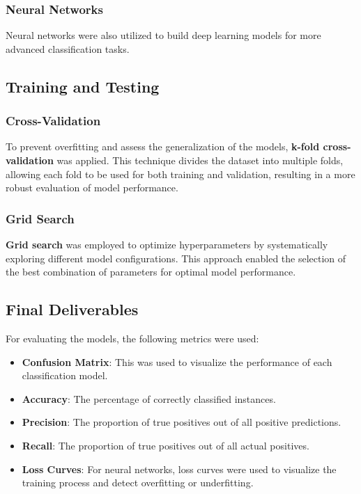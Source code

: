 \documentclass[a4paper,11pt]{article}
\begin{document}
\subsubsection*{Neural Networks}
Neural networks were also utilized to build deep learning models for more advanced classification tasks.

\subsection{Training and Testing}
\subsubsection*{Cross-Validation}
To prevent overfitting and assess the generalization of the models, \textbf{k-fold cross-validation} was applied. This technique divides the dataset into multiple folds, allowing each fold to be used for both training and validation, resulting in a more robust evaluation of model performance.

\subsubsection*{Grid Search}
\textbf{Grid search} was employed to optimize hyperparameters by systematically exploring different model configurations. This approach enabled the selection of the best combination of parameters for optimal model performance.

\subsection{Final Deliverables}
For evaluating the models, the following metrics were used:
\begin{itemize}
    \item \textbf{Confusion Matrix}: This was used to visualize the performance of each classification model.
    \item \textbf{Accuracy}: The percentage of correctly classified instances.
    \item \textbf{Precision}: The proportion of true positives out of all positive predictions.
    \item \textbf{Recall}: The proportion of true positives out of all actual positives.
    \item \textbf{Loss Curves}: For neural networks, loss curves were used to visualize the training process and detect overfitting or underfitting.
\end{itemize}
\end{document}
